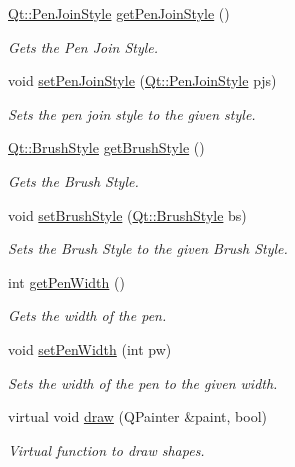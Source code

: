 \begin{DoxyCompactItemize}
\hyperlink{shape__input__file__specs_8txt_a007db2043c6063881de2043c05c9c4a9}{Qt\+::\+Pen\+Join\+Style} \hyperlink{classCircle_ac4ecd23537522a25d55e9d7197c7d9b5}{get\+Pen\+Join\+Style} ()
\begin{DoxyCompactList}\small\item\em Gets the Pen Join Style. \end{DoxyCompactList}\item 
void \hyperlink{classCircle_a1b0c03d17c9fc49bbcb6e8708f9bd827}{set\+Pen\+Join\+Style} (\hyperlink{shape__input__file__specs_8txt_a007db2043c6063881de2043c05c9c4a9}{Qt\+::\+Pen\+Join\+Style} pjs)
\begin{DoxyCompactList}\small\item\em Sets the pen join style to the given style. \end{DoxyCompactList}\item 
\hyperlink{shape__input__file__specs_8txt_ad07f6fe6c28dcb0b3bdc324a72d0051f}{Qt\+::\+Brush\+Style} \hyperlink{classCircle_a4ec3092959992a2a6b2782e622617bda}{get\+Brush\+Style} ()
\begin{DoxyCompactList}\small\item\em Gets the Brush Style. \end{DoxyCompactList}\item 
void \hyperlink{classCircle_a8029072b1eea3ef62c9010f68257b112}{set\+Brush\+Style} (\hyperlink{shape__input__file__specs_8txt_ad07f6fe6c28dcb0b3bdc324a72d0051f}{Qt\+::\+Brush\+Style} bs)
\begin{DoxyCompactList}\small\item\em Sets the Brush Style to the given Brush Style. \end{DoxyCompactList}\item 
int \hyperlink{classCircle_ab7d1e660ddced5d2f6fd36290f06083a}{get\+Pen\+Width} ()
\begin{DoxyCompactList}\small\item\em Gets the width of the pen. \end{DoxyCompactList}\item 
void \hyperlink{classCircle_abe124577ed86f9d9bcf77b0a5fdaca73}{set\+Pen\+Width} (int pw)
\begin{DoxyCompactList}\small\item\em Sets the width of the pen to the given width. \end{DoxyCompactList}\item 
virtual void \hyperlink{classCircle_aebc2ff1cc810905bc557d54e76aef936}{draw} (Q\+Painter \&paint, bool)
\begin{DoxyCompactList}\small\item\em Virtual function to draw shapes. \end{DoxyCompactList}\item 

\end{DoxyCompactItemize}
